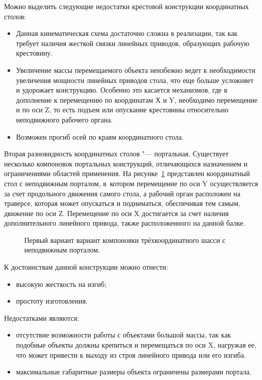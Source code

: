 Можно выделить следующие недостатки крестовой конструкции координатных столов:

\begin{itemize}
	\item Данная кинематическая схема достаточно сложна в реализации, так как требует наличия жесткой связки линейных приводов, образующих рабочую крестовину.
	\item Увеличение массы перемещаемого объекта неизбежно ведет к необходимости увеличения мощности линейных приводов стола, что еще больше усложняет и удорожает конструкцию. Особенно это касается механизмов, где в дополнение к перемещению по координатам Х и Y, необходимо перемещение и по оси Z, то есть подъем или опускание крестовины относительно неподвижного рабочего органа. 
	\item Возможен прогиб осей по краям координатного стола.
\end{itemize}

Вторая разновидность координатных столов "--- портальная. Существует несколько компоновок портальных конструкций, отличающихся назначением и ограничениями областей применения. На рисунке~\cref{fig:coord-1} представлен координатный стол с неподвижным порталом, в~котором перемещение по оси Y осуществляется за счет продольного движения самого стола, а рабочий орган расположен на траверсе, которая может опускаться и подниматься, обеспечивая тем самым, движение по оси Z. Перемещение по оси X достигается за счет наличия дополнительного линейного привода, также расположенного на данной балке.

\begin{figure}[ht]
	\caption{Первый вариант вариант компоновки трёхкоординатного шасси с неподвижным порталом.}\label{fig:coord-1}
\end{figure}

К достоинствам данной конструкции можно отнести:

\begin{itemize}
	\item высокую жесткость на изгиб;
	\item простоту изготовления.
\end{itemize}

Недостатками являются:

\begin{itemize}
	\item отсутствие возможности работы с объектами большой массы, так как подобные объекты должны крепиться и перемещаться по оси X, нагружая ее, что может привести к выходу из строя линейного привода или его изгиба.
	\item максимальные габаритные размеры объекта ограничены размерами портала.	
\end{itemize}

